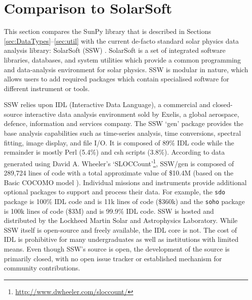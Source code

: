 \section{Comparison to SolarSoft}\label{sec:ssw}
This section compares the SunPy library that is described in Sections 
\ref{sec:DataTypes}--\ref{sec:util} with the current de-facto standard solar 
physics data analysis library: SolarSoft (SSW) \citep{ssw}.
SolarSoft is a set of integrated software libraries, databases, and system 
utilities which provide a common programming and data-analysis environment for 
solar physics. SSW is modular in nature, which allows users to add required 
packages which contain specialised software for different instrument or tools.


SSW relies upon IDL (Interactive Data 
Language), a commercial and closed-source interactive data analysis environment 
sold by Exelis, a global aerospace, defence, information and services company. 
The SSW `gen' package provides the base analysis capabilities such as time-series
analysis, time conversions, spectral fitting, image display, and file 
I/O. It is composed of 89\% IDL code while the remainder is mostly Perl (5.4\%) 
and csh scripts (3.8\%). 
According to data generated using David A. Wheeler's `SLOCCount'\footnote{\url{http://www.dwheeler.com/sloccount/}}, SSW/gen is composed of 
289,724 lines of code with a total approximate value of \$10.4M (based on the 
Basic COCOMO model \citep{cocomo}). 
Individual missions and instruments provide additional optional packages to 
support and process their data. For example, the \texttt{sdo} package \citep{sdo} is 
100\% IDL code and is 11k lines of code (\$360k) and the \texttt{soho} package 
\citep{soho} is 100k lines of code (\$3M) and is 99.9\% IDL code. SSW is hosted 
and distributed by the Lockheed Martin Solar and Astrophysics Laboratory.
While SSW itself is open-source and freely available, the IDL core is not. The cost 
of IDL is prohibitive for many undergraduates as well as institutions 
with limited means.
Even though SSW's source is open, the development of the source is primarily closed,
with no open issue tracker or established mechanism for community contributions.

